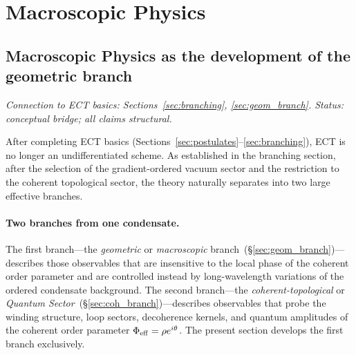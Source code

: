 \section{Macroscopic Physics}
\label{sec:macroscopic}

\subsection{Macroscopic Physics as the development
of the geometric branch}
\label{sec:mp_intro}

\textit{Connection to ECT basics:
Sections~\ref{sec:branching}, \ref{sec:geom_branch}.
Status: conceptual bridge; all claims structural.}

\medskip
After completing ECT basics
(Sections~\ref{sec:postulates}--\ref{sec:branching}),
ECT is no longer an undifferentiated scheme.
As established in the branching section, after the selection of
the gradient-ordered vacuum sector and the restriction to the
coherent topological sector, the theory naturally separates into
two large effective branches.

\paragraph{Two branches from one condensate.}
The first branch---the \emph{geometric} or \emph{macroscopic}
branch~(\S\ref{sec:geom_branch})---describes those observables
that are insensitive to the local phase of the coherent order
parameter and are controlled instead by long-wavelength variations
of the ordered condensate background.
The second branch---the \emph{coherent-topological} or
\emph{Quantum Sector}~(\S\ref{sec:coh_branch})---describes
observables that probe the winding structure, loop sectors,
decoherence kernels, and quantum amplitudes of the coherent
order parameter $\Phi_{\rm eff}=\rho e^{i\theta}$.
The present section develops the first branch exclusively.

